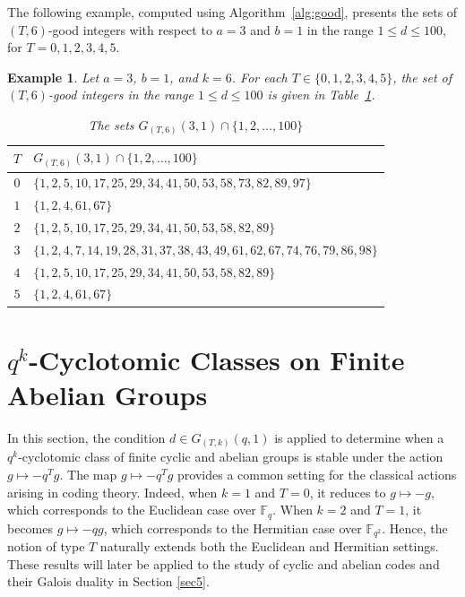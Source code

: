 \documentclass[pdflatex,sn-mathphys-num]{sn-jnl}%
\theoremstyle{thmstyleone}%
\theoremstyle{thmstyletwo}%
\newtheorem{example}{Example}%
\theoremstyle{thmstylethree}%
\newcommand{\F}{\mathbb{F}}
\begin{document}
The following example, computed using Algorithm~\ref{alg:good}, presents the sets of $(T,6)$-good integers with respect to $a=3$ and $b=1$ in the range $1\le d\le 100$, for $T=0,1,2,3,4,5$.

\begin{example}
Let $a=3$, $b=1$, and $k=6$. For each $T\in\{0,1,2,3,4,5\}$, the set of $(T,6)$-good integers  in the range $1\le d\le 100$ is given in Table~\ref{tab:36-good}.

\begin{table}[!hbt]
\centering
\caption{The sets $G_{(T,6)}(3,1)\cap \{1,2,\dots,100\}$}
\label{tab:36-good}
\begin{tabular}{cl}
\toprule
$T$ & $G_{(T,6)}(3,1)\cap \{1,2,\dots,100\}$ \\
\midrule
$0$ &
$\{1,2,5,10,17,25,29,34,41,50,53,58,73,82,89,97\}$ \\[1mm]

$1$ &
$\{1,2,4,61,67\}$ \\[1mm]

$2$ &
$\{1,2,5,10,17,25,29,34,41,50,53,58,82,89\}$ \\[1mm]

$3$ &
$\{1,2,4,7,14,19,28,31,37,38,43,49,61,62,67,74,76,79,86,98\}$ \\[1mm]

$4$ &
$\{1,2,5,10,17,25,29,34,41,50,53,58,82,89\}$ \\[1mm]

$5$ &
$\{1,2,4,61,67\}$ \\
\bottomrule
\end{tabular}
\end{table}

\end{example}

\section{$q^k$-Cyclotomic Classes on Finite Abelian Groups}\label{sec4}

 In this section, the condition $
d\in G_{(T,k)}(q,1)$ is applied   
to determine when a $q^k$-cyclotomic class  of  finite cyclic and abelian groups is stable under the action $
g\mapsto -q^T g
$. The map
$
g\mapsto -q^T g
$
provides a common setting for the classical actions arising in coding theory. Indeed, when $k=1$ and $T=0$, it reduces to
$
g\mapsto -g$,
which corresponds to the Euclidean case over $\F_q$. When $k=2$ and $T=1$, it becomes
$
g\mapsto -qg$,
which corresponds to the Hermitian case over $\F_{q^2}$. Hence, the notion of type $T$ naturally extends both the Euclidean and Hermitian settings. These results will later be applied to the study of cyclic and abelian codes and their Galois duality in Section \ref{sec5}.
\end{document}
